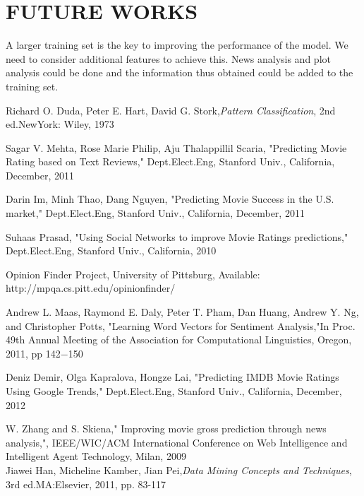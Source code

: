 \chapter{FUTURE WORKS}
\begin{description}
A larger training set is the key to improving the performance of the model. We need to consider additional features to achieve this. News analysis and plot analysis could be done and the information thus obtained could be added to the training set.

\end{description}

\begin{thebibliography}{10}
 Richard O. Duda, Peter E. Hart, David G.
Stork,{\it Pattern Classification}, 2nd ed.NewYork: Wiley, 1973


Sagar V. Mehta, Rose Marie Philip, Aju Thalappillil Scaria, "Predicting Movie Rating based on Text Reviews," Dept.Elect.Eng, Stanford Univ., California, December, 2011


Darin Im, Minh Thao, Dang Nguyen, "Predicting Movie Success in the U.S. market," Dept.Elect.Eng, Stanford Univ., California, December, 2011
 



Suhaas Prasad, "Using Social Networks to improve Movie Ratings predictions,"
Dept.Elect.Eng, Stanford Univ., California, 2010

Opinion Finder Project, University of Pittsburg,
Available: http://mpqa.cs.pitt.edu/opinionfinder/


Andrew L. Maas, Raymond E. Daly, Peter T. Pham, Dan Huang,
Andrew Y. Ng, and Christopher Potts, "Learning Word Vectors for Sentiment Analysis,"In Proc. 49th Annual Meeting of the Association for Computational Linguistics, Oregon, 2011, pp 142$-$150


 Deniz Demir, Olga Kapralova, Hongze Lai, "Predicting IMDB Movie Ratings Using Google Trends," Dept.Elect.Eng, Stanford Univ., California, December, 2012

W. Zhang and S. Skiena," Improving movie gross prediction through news analysis,", IEEE/WIC/ACM International Conference on Web Intelligence and Intelligent Agent Technology, Milan, 2009\\

 Jiawei Han, Micheline Kamber, Jian Pei,{\it  Data Mining Concepts and Techniques}, 3rd ed.MA:Elsevier, 2011, pp. 83-117
\end{thebibliography}
